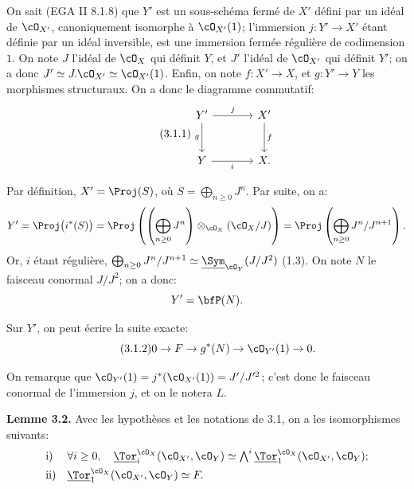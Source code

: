 On sait (EGA II 8.1.8) que \(Y'\) est un sous-schéma fermé de \(X'\) défini par un idéal de \(\cO_{X'}\), canoniquement isomorphe à \(\cO_{X'}(1)\); l'immersion \(j:Y'\to X'\) étant définie par un idéal inversible, est une immersion fermée régulière de codimension \(1\). On note \(J\) l'idéal de \(\cO_X\) qui définit \(Y\), et \(J'\) l'idéal de \(\cO_{X'}\) qui définit \(Y'\); on a donc \(J'\simeq J.\cO_{X'}\simeq\cO_{X'}(1)\). Enfin, on note \(f:X'\to X\), et \(g:Y'\to Y\) les morphismes structuraux. On a donc le diagramme commutatif:
\begin{equation}\tag{3.1.1}
\begin{tikzcd}[column sep=large,row sep=large]
Y' \arrow[r,"j"] \arrow[d,"g"'] & X' \arrow[d,"f"]\\
Y \arrow[r,"i"'] & X.
\end{tikzcd}
\end{equation}

Par définition, \(X'=\Proj(S)\), où \(S=\bigoplus_{n\ge0}J^n\). Par suite, on a:
\[
Y'=\Proj\bigl(i^*(S)\bigr)
=\Proj\left(\left(\bigoplus_{n\ge0}J^n\right)\otimes_{\cO_X}(\cO_X/J)\right)
=\Proj\left(\bigoplus_{n\ge0}J^n/J^{n+1}\right).
\]
Or, \(i\) étant régulière, \(\bigoplus_{n\ge0}J^n/J^{n+1}\simeq \underline{\Sym}_{\cO_Y}(J/J^2)\) (1.3). On note \(N\) le faisceau conormal \(J/J^2\); on a donc:
\[
Y'=\bfP(N).
\]

Sur \(Y'\), on peut écrire la suite exacte:
\begin{equation}\tag{3.1.2}
0\to F\to g^*(N)\to\cO_{Y'}(1)\to0.
\end{equation}

On remarque que \(\cO_{Y'}(1)=j^*(\cO_{X'}(1))=J'/J'^2\); c'est donc le faisceau conormal de l'immersion \(j\), et on le notera \(L\).

\textbf{Lemme 3.2.} Avec les hypothèses et les notations de 3.1, on a les isomorphismes suivants:
\[
\begin{array}{ll}
\text{i)}&
\forall i\ge0,\quad
\underline{\Tor}_i^{\cO_X}(\cO_{X'},\cO_Y)
\simeq
\bigwedge^i\underline{\Tor}_1^{\cO_X}(\cO_{X'},\cO_Y);\\[4pt]
\text{ii)}&
\underline{\Tor}_1^{\cO_X}(\cO_{X'},\cO_Y)\simeq F.
\end{array}
\]


